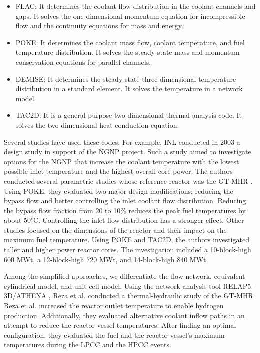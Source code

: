 \begin{itemize}
\item FLAC: It determines the coolant flow distribution in the coolant channels and gaps.
It solves the one-dimensional momentum equation for incompressible flow and the continuity equations for mass and energy.

\item POKE: It determines the coolant mass flow, coolant temperature, and fuel temperature distribution.
It solves the steady-state mass and momentum conservation equations for parallel channels.

\item DEMISE: It determines the steady-state three-dimensional temperature distribution in a standard element.
It solves the temperature in a network model.

\item TAC2D: It is a general-purpose two-dimensional thermal analysis code.
It solves the two-dimensional heat conduction equation.
\end{itemize}

Several studies have used these codes.
For example, \gls{INL} conducted in 2003 a design study \cite{macdonald_ngnp_2003} in support of the \gls{NGNP} project.
Such a study aimed to investigate options for the NGNP that increase the coolant temperature with the lowest possible inlet temperature and the highest overall core power.
The authors conducted several parametric studies whose reference reactor was the GT-MHR \cite{general_atomics_gas_1996}.
Using POKE, they evaluated two major design modifications: reducing the bypass flow and better controlling the inlet coolant flow distribution.
Reducing the bypass flow fraction from 20 to 10$\%$ reduces the peak fuel temperatures by about 50$^{\circ}$C.
Controlling the inlet flow distribution has a stronger effect.
Other studies focused on the dimensions of the reactor and their impact on the maximum fuel temperature.
Using POKE and TAC2D, the authors investigated taller and higher power reactor cores.
The investigation included a 10-block-high 600 MWt, a 12-block-high 720 MWt, and 14-block-high 840 MWt.

Among the simplified approaches, we differentiate the flow network, equivalent cylindrical model, and unit cell model.
Using the network analysis tool RELAP5-3D/ATHENA \cite{inl_relap5-3dathena_2005}, Reza et al. \cite{reza_design_2006} conducted a thermal-hydraulic study of the GT-MHR.
Reza et al. increased the reactor outlet temperature to enable hydrogen production.
Additionally, they evaluated alternative coolant inflow paths in an attempt to reduce the reactor vessel temperatures.
After finding an optimal configuration, they evaluated the fuel and the reactor vessel's maximum temperatures during the \gls{LPCC} and the \gls{HPCC} events.

